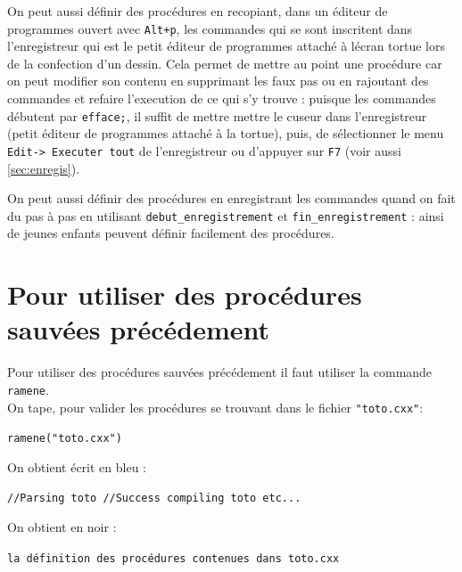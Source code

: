 \documentclass[a4paper,11pt]{book}
\begin{document}
On peut aussi d\'efinir des proc\'edures en recopiant, dans un \'editeur de 
programmes ouvert avec {\tt Alt+p}, les commandes qui se sont
inscritent dans l'enregistreur qui est le petit \'editeur de programmes 
attach\'e \`a l\'ecran tortue
lors de la confection d'un dessin. Cela permet de mettre au
point une proc\'edure car on peut modifier son contenu en supprimant les faux 
pas ou en rajoutant des commandes et refaire 
l'execution de ce qui s'y trouve : puisque les commandes  d\'ebutent par 
{\tt efface;}, il suffit de mettre mettre le cuseur dans l'enregistreur (petit 
\'editeur de programmes attach\'e \`a la tortue),
puis, de s\'electionner le menu {\tt Edit-> Executer tout} de l'enregistreur
ou d'appuyer sur {\tt F7} (voir aussi \ref{sec:enregis}).

On peut aussi d\'efinir des proc\'edures en enregistrant les commandes quand on 
fait du pas \`a pas en utilisant {\tt debut\_enregistrement} et 
{\tt fin\_enregistrement} : ainsi de jeunes enfants peuvent d\'efinir 
facilement des proc\'edures.

\section{Pour utiliser des proc\'edures sauv\'ees pr\'ec\'edement}
\noindent Pour utiliser des proc\'edures sauv\'ees pr\'ec\'edement il faut 
utiliser la commande {\tt ramene}.\\
On tape, pour valider les proc\'edures se trouvant dans le fichier 
{\tt "toto.cxx"}:\\
\begin{center}{\tt ramene("toto.cxx")}\end{center}
On obtient \'ecrit en bleu :
\begin{center}{\tt //Parsing toto //Success compiling toto etc...}\end{center}
On obtient en noir :
\begin{center}{\tt la d\'efinition des proc\'edures contenues dans toto.cxx}\end{center}
\end{document}
